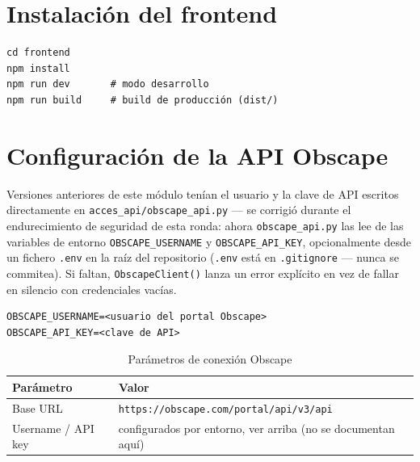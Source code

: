 \section{Instalación del frontend}

\begin{codebox}[]
\begin{verbatim}
cd frontend
npm install
npm run dev       # modo desarrollo
npm run build     # build de producción (dist/)
\end{verbatim}
\end{codebox}

\section{Configuración de la API Obscape}

\begin{warnbox}
Versiones anteriores de este módulo tenían el usuario y la clave de API escritos directamente
en \texttt{acces\_api/obscape\_api.py} — se corrigió durante el endurecimiento de seguridad de
esta ronda: ahora \texttt{obscape\_api.py} las lee de las variables de entorno
\texttt{OBSCAPE\_USERNAME} y \texttt{OBSCAPE\_API\_KEY}, opcionalmente desde un fichero
\texttt{.env} en la raíz del repositorio (\texttt{.env} está en \texttt{.gitignore} — nunca se
commitea). Si faltan, \texttt{ObscapeClient()} lanza un error explícito en vez de fallar en
silencio con credenciales vacías.
\end{warnbox}

\begin{codebox}
\begin{verbatim}
OBSCAPE_USERNAME=<usuario del portal Obscape>
OBSCAPE_API_KEY=<clave de API>
\end{verbatim}
\end{codebox}

\begin{table}[H]
\centering
\caption{Parámetros de conexión Obscape}
\begin{tabular}{L{4cm} L{8cm}}
\toprule
\textbf{Parámetro} & \textbf{Valor} \\
\midrule
Base URL   & \texttt{https://obscape.com/portal/api/v3/api} \\
Username / API key & configurados por entorno, ver arriba (no se documentan aquí) \\
\bottomrule
\end{tabular}
\end{table}

